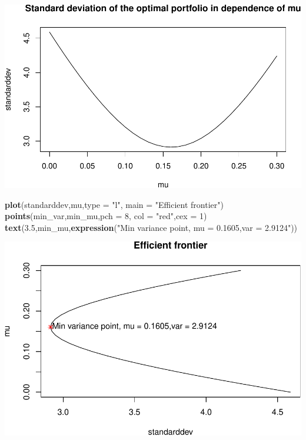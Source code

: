 \documentclass[]{article}
\newenvironment{Shaded}{\begin{snugshade}}{\end{snugshade}}
\newcommand{\KeywordTok}[1]{\textcolor[rgb]{0.13,0.29,0.53}{\textbf{#1}}}
\newcommand{\DataTypeTok}[1]{\textcolor[rgb]{0.13,0.29,0.53}{#1}}
\newcommand{\DecValTok}[1]{\textcolor[rgb]{0.00,0.00,0.81}{#1}}
\newcommand{\FloatTok}[1]{\textcolor[rgb]{0.00,0.00,0.81}{#1}}
\newcommand{\StringTok}[1]{\textcolor[rgb]{0.31,0.60,0.02}{#1}}
\newcommand{\NormalTok}[1]{#1}
\begin{document}
\includegraphics{Markowitz_Research_Me_files/figure-latex/unnamed-chunk-15-1.pdf}

\begin{Shaded}
\begin{Highlighting}[]
\KeywordTok{plot}\NormalTok{(standarddev,mu,}\DataTypeTok{type =} \StringTok{"l"}\NormalTok{, }\DataTypeTok{main =} \StringTok{"Efficient frontier"}\NormalTok{)}
\KeywordTok{points}\NormalTok{(min_var,min_mu,}\DataTypeTok{pch =} \DecValTok{8}\NormalTok{, }\DataTypeTok{col =} \StringTok{"red"}\NormalTok{,}\DataTypeTok{cex =} \DecValTok{1}\NormalTok{)}
\KeywordTok{text}\NormalTok{(}\FloatTok{3.5}\NormalTok{,min_mu,}\KeywordTok{expression}\NormalTok{(}\StringTok{"Min variance point, mu = 0.1605,var = 2.9124"}\NormalTok{))}
\end{Highlighting}
\end{Shaded}

\includegraphics{Markowitz_Research_Me_files/figure-latex/unnamed-chunk-15-2.pdf}
\end{document}
